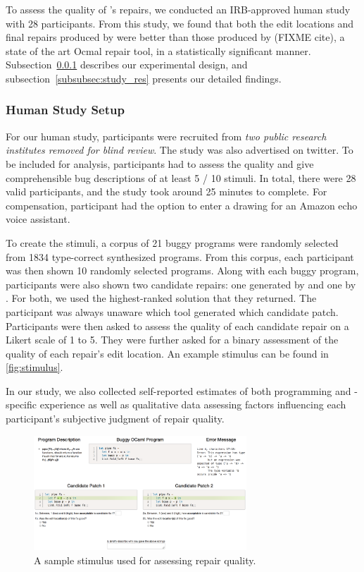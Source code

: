To assess the quality of \toolname's repairs, we conducted an IRB-approved human
study with 28 participants. From this study, we found that both the edit
locations and final repairs produced by \toolname were better than those
produced by \seminal (FIXME cite), a state of the art Ocmal repair tool, in a
statistically significant manner. Subsection~\ref{subsubsec:study_setup}
describes our experimental design, and subsection~\ref{subsubsec:study_res}
presents our detailed findings.

\subsubsection{Human Study Setup}
\label{subsubsec:study_setup}


For our human study, participants were recruited from \emph{two public research
institutes removed for blind review}. The study was also advertised on twitter.
To be included for analysis, participants had to assess the quality and give
comprehensible bug descriptions of at least 5 / 10 stimuli. In total, there were
28 valid participants, and the study took around 25 minutes to complete. For
compensation, participant had the option to enter a drawing for an Amazon echo
voice assistant.

To create the stimuli, a corpus of 21 buggy programs were randomly selected from
1834 type-correct synthesized programs. From this corpus, each participant was
then shown 10 randomly selected programs. Along with each buggy program,
participants were also shown two candidate repairs: one generated by \toolname
and one by \seminal. For both, we used the highest-ranked solution that they
returned. The participant was always unaware which tool generated which
candidate patch. Participants were then asked to assess the quality of each
candidate repair on a Likert scale of 1 to 5. They were further asked for a
binary assessment of the quality of each repair's edit location. An example
stimulus can be found in \autoref{fig:stimulus}.

In our study, we also collected self-reported estimates of both programming and
\ocaml-specific experience as well as qualitative data assessing factors
influencing each participant's subjective judgment of repair quality.

\begin{figure}
  \includegraphics[width=8cm]{SampleStimuli.png}
  \caption{A sample stimulus used for assessing repair quality.}
  \label{fig:stimulus}
\end{figure}


